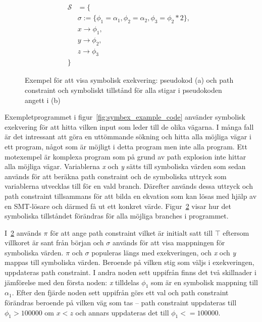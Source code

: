 \begin{figure}[H]
\begin{subfigure}[t]{0.5\textwidth}
    \caption{} %
    \label{fig:symbex_example_graph}
  \end{subfigure}
  \begin{align*}
    \mathcal{S} & = \{ &\\
    &\sigma := \{\phi_1 = \alpha_1, \phi_2 = \alpha_2, \phi_3 = \phi_2 *
    2\},&\\
    &x \rightarrow \phi_1,&\\
    &y \rightarrow \phi_2,&\\
    &z \rightarrow \phi_3&\\
    \}
  \end{align*}
  \caption{Exempel för att visa symbolisk exekvering: pseudokod (a) och path
  constraint och symboliskt tillstånd för alla stigar i pseudokoden angett i (b)}
\end{figure}

Exempletprogrammet i figur~\ref{fig:symbex_example_code} använder symbolisk
exekvering för att hitta vilken input som leder till de olika vägarna. I många
fall är det intressant att göra en uttömmande sökning och hitta alla möjliga
vägar i ett program, något som är möjligt i detta program men inte alla program.
Ett motexempel är komplexa program som på grund av path explosion inte hittar
alla möjliga vägar.
Variablerna \emph{x} och \emph{y} sätts till symboliska värden som sedan används
för att beräkna path constraint och de symboliska uttryck som variablerna
utvecklas till för en vald branch. Därefter används dessa uttryck och path
constraint tillsammans för att bilda en ekvation som kan lösas med hjälp av en
SMT-lösare och därmed få ut ett konkret värde.
Figur~\ref{fig:symbex_example_graph} visar hur det symboliska tillståndet
förändras för alla möjliga branches i programmet.

I~\ref{fig:symbex_example_graph} används $\pi$ för att ange path constraint
vilket är initialt satt till $\top$ eftersom villkoret är sant från början och
$\sigma$ används för att visa mappningen för symboliska värden. $\pi$ och
$\sigma$ populeras längs med exekveringen, och \emph{x} och \emph{y} mappas till
symboliska värden. Beroende på vilken stig som väljs i exekveringen, uppdateras
path constraint. I andra noden sett uppifrån finns det två skillnader i
jämförelse med den första noden: \emph{x} tilldelas $\phi_1$ som är en symbolisk
mappning till $\alpha_1$. Efter den fjärde noden sett uppifrån görs ett val och
path constraint förändras beroende på vilken väg som tas -- path constraint
uppdateras till $\phi_1 > 100000$ om $x < z$ och annars uppdateras det till
$\phi_1 <= 100000$.
